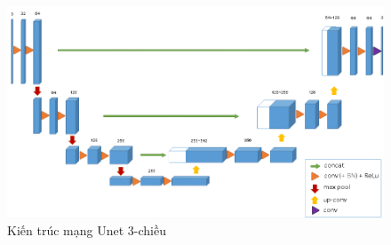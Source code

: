 \begin{figure}[h]
\centering
    \includegraphics[totalheight=7cm]{Images/3Dunet.png}
    \caption{Kiến trúc mạng Unet 3-chiều}
    \label{skip_conn}
\end{figure}



